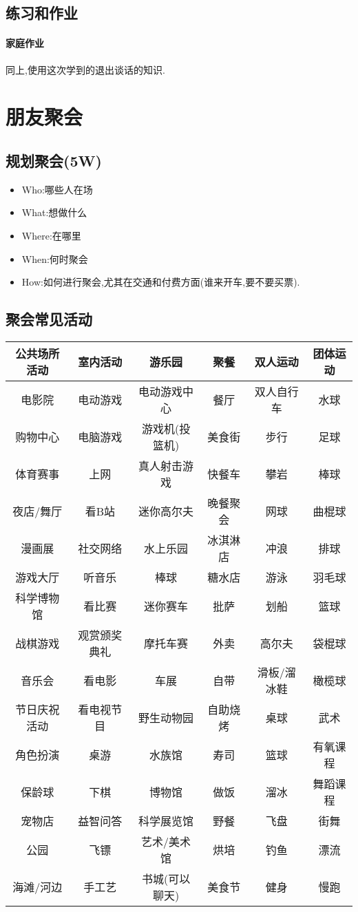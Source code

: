 \documentclass[UTF8]{article}
\newcommand{\Exer}{\subsection{练习和作业}}
\newcommand{\exer}{\paragraph*{家庭作业}}
\begin{document}
\Exer \exer 同上,使用这次学到的退出谈话的知识.

\newpage
\section{朋友聚会}
\subsection{规划聚会(5W)\label{8.1}}
\begin{itemize}
    \item Who:哪些人在场
    \item What:想做什么
    \item Where:在哪里
    \item When:何时聚会
    \item How:如何进行聚会,尤其在交通和付费方面(谁来开车,要不要买票).
\end{itemize}
\subsection{聚会常见活动}
\begin{center}
\begin{tabular}{cccccc}
\textbf{公共场所活动}&\textbf{室内活动}&\textbf{游乐园}&\textbf{聚餐}&\textbf{双人运动}&\textbf{团体运动}\\\hline
电影院&电动游戏&电动游戏中心&餐厅&双人自行车&水球\\
购物中心&电脑游戏&游戏机(投篮机)&美食街&步行&足球\\
体育赛事&上网&真人射击游戏&快餐车&攀岩&棒球\\
夜店/舞厅&看B站&迷你高尔夫&晚餐聚会&网球&曲棍球\\
漫画展&社交网络&水上乐园&冰淇淋店&冲浪&排球\\
游戏大厅&听音乐&棒球&糖水店&游泳&羽毛球\\
科学博物馆&看比赛&迷你赛车&批萨&划船&篮球\\
战棋游戏&观赏颁奖典礼&摩托车赛&外卖&高尔夫&袋棍球\\
音乐会&看电影&车展&自带&滑板/溜冰鞋&橄榄球\\
节日庆祝活动&看电视节目&野生动物园&自助烧烤&桌球&武术\\
角色扮演&桌游&水族馆&寿司&篮球&有氧课程\\
保龄球&下棋&博物馆&做饭&溜冰&舞蹈课程\\
宠物店&益智问答&科学展览馆&野餐&飞盘&街舞\\
公园&飞镖&艺术/美术馆&烘培&钓鱼&漂流\\
海滩/河边&手工艺&书城(可以聊天)&美食节&健身&慢跑\\
\end{tabular}
\end{center}
\end{document}
